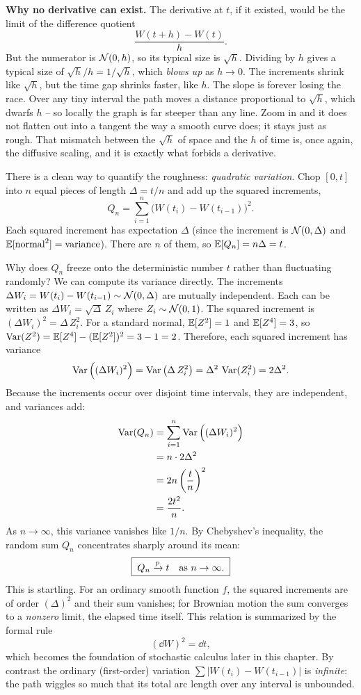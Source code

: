 \begin{happeningbox}
\textbf{Why no derivative can exist.} The derivative at $t$, if it existed, would
be the limit of the difference quotient
\[
  \frac{W(t+h)-W(t)}{h}.
\]
But the numerator is $\mathcal{N}(0,h)$, so its typical size is $\sqrt h$. Dividing by
$h$ gives a typical size of $\sqrt h / h = 1/\sqrt h$, which \emph{blows up} as
$h\to0$. The increments shrink like $\sqrt h$, but the time gap shrinks faster,
like $h$. The slope is forever losing the race. Over any tiny interval the path
moves a distance proportional to $\sqrt h$, which dwarfs $h$ -- so locally the
graph is far steeper than any line. Zoom in and it does not flatten out into a
tangent the way a smooth curve does; it stays just as rough. That mismatch
between the $\sqrt h$ of space and the $h$ of time is, once again, the diffusive
scaling, and it is exactly what forbids a derivative.
\end{happeningbox}

There is a clean way to quantify the roughness: \emph{quadratic variation}.
Chop $[0,t]$ into $n$ equal pieces of length $\Delta = t/n$ and add up the squared
increments,
\[
  Q_n = \sum_{i=1}^{n}\Big(W(t_i)-W(t_{i-1})\Big)^2 .
\]
Each squared increment has expectation $\Delta$ (since the increment is
$\mathcal{N}(0,\Delta)$ and $\operatorname{\mathbb{E}}[\text{normal}^2]=\text{variance}$). There are $n$ of
them, so $\operatorname{\mathbb{E}}[Q_n] = n\Delta = t$.

Why does $Q_n$ freeze onto the deterministic number $t$ rather than fluctuating
randomly? We can compute its variance directly. The increments
$\Delta W_i = W(t_i) - W(t_{i-1}) \sim \mathcal{N}(0, \Delta)$ are mutually independent.
Each can be written as $\Delta W_i = \sqrt{\Delta}\,Z_i$ where $Z_i \sim \mathcal{N}(0,1)$.
The squared increment is $(\Delta W_i)^2 = \Delta\,Z_i^2$. For a standard normal,
$\operatorname{\mathbb{E}}[Z^2] = 1$ and $\operatorname{\mathbb{E}}[Z^4] = 3$, so $\operatorname{Var}(Z^2) = \operatorname{\mathbb{E}}[Z^4] - (\operatorname{\mathbb{E}}[Z^2])^2 = 3 - 1 = 2$.
Therefore, each squared increment has variance
\[
  \operatorname{Var}\Big((\Delta W_i)^2\Big) = \operatorname{Var}\big(\Delta\,Z_i^2\big) = \Delta^2\,\operatorname{Var}(Z_i^2) = 2\Delta^2.
\]
Because the increments occur over disjoint time intervals, they are independent,
and variances add:
\begin{align*}
  \operatorname{Var}(Q_n) &= \sum_{i=1}^n \operatorname{Var}\Big((\Delta W_i)^2\Big) \\
  &= n \cdot 2\Delta^2 \\
  &= 2n\left(\frac{t}{n}\right)^2 \\
  &= \frac{2t^2}{n}.
\end{align*}
As $n\to\infty$, this variance vanishes like $1/n$. By Chebyshev's inequality, the
random sum $Q_n$ concentrates sharply around its mean:
\[
  \boxed{\;Q_n \xrightarrow{p} t \quad\text{as } n\to\infty.\;}
\]
This is startling. For an ordinary smooth function $f$, the squared increments are
of order $(\Delta)^2$ and their sum vanishes; for Brownian motion the sum
converges to a \emph{nonzero} limit, the elapsed time itself. This relation is summarized by the formal rule
\[
  (\dd W)^2 = \dd t,
\]
which becomes the foundation of stochastic calculus later in this chapter. By contrast the
ordinary (first-order) variation $\sum |W(t_i)-W(t_{i-1})|$ is \emph{infinite}:
the path wiggles so much that its total arc length over any interval is unbounded.

